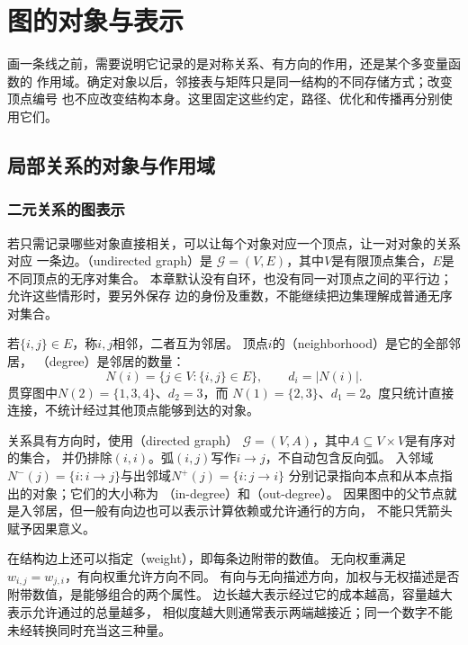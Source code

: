 \section{图的对象与表示}
\label{sec:graph-theory-objects-representations}

画一条线之前，需要说明它记录的是对称关系、有方向的作用，还是某个多变量函数的
作用域。确定对象以后，邻接表与矩阵只是同一结构的不同存储方式；改变顶点编号
也不应改变结构本身。这里固定这些约定，路径、优化和传播再分别使用它们。

\subsection{局部关系的对象与作用域}
\label{sec:graph-theory-local-relations}

\subsubsection{二元关系的图表示}
\label{sec:graph-theory-binary-relations}

若只需记录哪些对象直接相关，可以让每个对象对应一个顶点，让一对对象的关系对应
一条边。（undirected graph）是
\(\mathcal G=(V,E)\)，其中\(V\)是有限顶点集合，\(E\)是不同顶点的无序对集合。
本章默认没有自环，也没有同一对顶点之间的平行边；允许这些情形时，要另外保存
边的身份及重数，不能继续把边集理解成普通无序对集合。

若\(\{i,j\}\in E\)，称\(i,j\)相邻，二者互为邻居。
顶点\(i\)的（neighborhood）是它的全部邻居，
（degree）是邻居的数量：
\[
  N(i)=\{j\in V:\{i,j\}\in E\},\qquad d_i=|N(i)|.
\]
贯穿图中\(N(2)=\{1,3,4\}\)、\(d_2=3\)，而
\(N(1)=\{2,3\}\)、\(d_1=2\)。度只统计直接连接，不统计经过其他顶点能够到达的对象。

关系具有方向时，使用（directed graph）
\(\mathcal G=(V,A)\)，其中\(A\subseteq V\times V\)是有序对的集合，
并仍排除\((i,i)\)。弧\((i,j)\)写作\(i\to j\)，不自动包含反向弧。
入邻域\(N^-(j)=\{i:i\to j\}\)与出邻域\(N^+(j)=\{i:j\to i\}\)
分别记录指向本点和从本点指出的对象；它们的大小称为
（in-degree）和（out-degree）。
因果图中的父节点就是入邻居，但一般有向边也可以表示计算依赖或允许通行的方向，
不能只凭箭头赋予因果意义。

在结构边上还可以指定（weight），即每条边附带的数值。
无向权重满足\(w_{i,j}=w_{j,i}\)，有向权重允许方向不同。
有向与无向描述方向，加权与无权描述是否附带数值，是能够组合的两个属性。
边长越大表示经过它的成本越高，容量越大表示允许通过的总量越多，
相似度越大则通常表示两端越接近；同一个数字不能未经转换同时充当这三种量。

